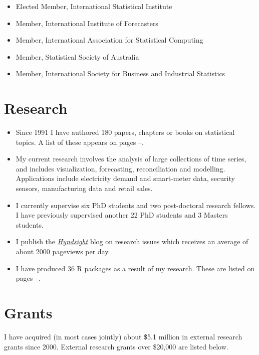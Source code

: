 \documentclass[10pt,a4paper,]{article}
\providecommand{\tightlist}{%
  \setlength{\itemsep}{0pt}\setlength{\parskip}{0pt}}
\newcounter{papers}
\begin{document}
\begin{itemize}
\tightlist
\item
  Elected Member, International Statistical Institute
\item
  Member, International Institute of Forecasters
\item
  Member, International Association for Statistical Computing
\item
  Member, Statistical Society of Australia
\item
  Member, International Society for Business and Industrial Statistics
\end{itemize}

\hypertarget{research}{%
\section{Research}\label{research}}

\begin{itemize}
\tightlist
\item
  Since 1991 I have authored 180 papers, chapters or books on
  statistical topics. A list of these appears on pages
  \pageref{papersstart}--\pageref{papersend}.
\item
  My current research involves the analysis of large collections of time
  series, and includes visualization, forecasting, reconciliation and
  modelling. Applications include electricity demand and smart-meter
  data, security sensors, manufacturing data and retail sales.
\item
  I currently supervise six PhD students and two post-doctoral research
  fellows. I have previously supervised another 22 PhD students and 3
  Masters students.
\item
  I publish the
  \href{https://robjhyndman.com/hyndsight}{\emph{Hyndsight}} blog on
  research issues which receives an average of about 2000 pageviews per
  day.
\item
  I have produced 36 R packages as a result of my research. These are
  listed on pages \pageref{packagestart}--\pageref{packageend}.
\end{itemize}

\hypertarget{grants}{%
\section{Grants}\label{grants}}

I have acquired (in most cases jointly) about \$5.1 million in external
research grants since 2000. External research grants over \$20,000 are
listed below.\vspace*{0.2cm}
\end{document}
